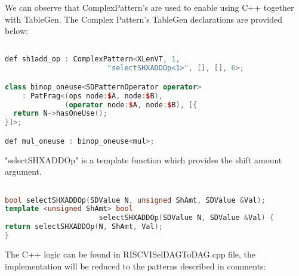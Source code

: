 We can observe that ComplexPattern's  are used to enable using C++ together with TableGen. The Complex Pattern's TableGen declarations are provided below:

\begin{minipage}{\linewidth}
\begin{lstlisting}[language=C++, caption={TableGen Declaration of ComplexPatterns}]

def sh1add_op : ComplexPattern<XLenVT, 1, 
                        "selectSHXADDOp<1>", [], [], 6>;

class binop_oneuse<SDPatternOperator operator>
    : PatFrag<(ops node:$A, node:$B),
              (operator node:$A, node:$B), [{
  return N->hasOneUse();
}]>;

def mul_oneuse : binop_oneuse<mul>;
\end{lstlisting}
\end{minipage}

"selectSHXADDOp" is a template function which provides the shift amount argument.

\begin{lstlisting}[language=C++, caption={Template Function of the ComplexPattern for "sh1add\_op"}]

bool selectSHXADDOp(SDValue N, unsigned ShAmt, SDValue &Val);
template <unsigned ShAmt> bool 
                      selectSHXADDOp(SDValue N, SDValue &Val) {
return selectSHXADDOp(N, ShAmt, Val);
}
\end{lstlisting}

The C++ logic can be found in RISCVISelDAGToDAG.cpp file, the implementation will be reduced to the patterns described in comments:

